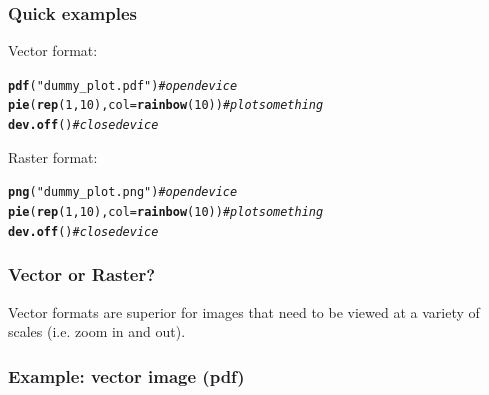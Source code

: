 \documentclass[12pt]{beamer}\usepackage[]{graphicx}\usepackage[]{color}
\makeatletter
\newcommand{\hlnum}[1]{\textcolor[rgb]{0.686,0.059,0.569}{#1}}%
\newcommand{\hlstr}[1]{\textcolor[rgb]{0.192,0.494,0.8}{#1}}%
\newcommand{\hlcom}[1]{\textcolor[rgb]{0.678,0.584,0.686}{\textit{#1}}}%
\newcommand{\hlstd}[1]{\textcolor[rgb]{0.345,0.345,0.345}{#1}}%
\newcommand{\hlkwc}[1]{\textcolor[rgb]{0.333,0.667,0.333}{#1}}%
\newcommand{\hlkwd}[1]{\textcolor[rgb]{0.737,0.353,0.396}{\textbf{#1}}}%
\newenvironment{kframe}{%
 \def\at@end@of@kframe{}%
 \ifinner\ifhmode%
  \def\at@end@of@kframe{\end{minipage}}%
  \begin{minipage}{\columnwidth}%
 \fi\fi%
 \def\FrameCommand##1{\hskip\@totalleftmargin \hskip-\fboxsep
 \colorbox{shadecolor}{##1}\hskip-\fboxsep
     \hskip-\linewidth \hskip-\@totalleftmargin \hskip\columnwidth}%
 \MakeFramed {\advance\hsize-\width
   \@totalleftmargin\z@ \linewidth\hsize
   \@setminipage}}%
 {\par\unskip\endMakeFramed%
 \at@end@of@kframe}
\newenvironment{knitrout}{}{} %
\makeatother
\begin{document}
\begin{frame}[fragile]
\frametitle{Quick examples}

Vector format:
\begin{knitrout}\footnotesize
{}\color{fgcolor}\begin{kframe}
\begin{alltt}
\hlkwd{pdf}\hlstd{(}\hlstr{"dummy_plot.pdf"}\hlstd{)}  \hlcom{# open device}
\hlkwd{pie}\hlstd{(}\hlkwd{rep}\hlstd{(}\hlnum{1}\hlstd{,} \hlnum{10}\hlstd{),} \hlkwc{col} \hlstd{=} \hlkwd{rainbow}\hlstd{(}\hlnum{10}\hlstd{))}  \hlcom{# plot something}
\hlkwd{dev.off}\hlstd{()}  \hlcom{# close device}
\end{alltt}
\end{kframe}
\end{knitrout}

\bigskip

Raster format:
\begin{knitrout}\footnotesize
{}\color{fgcolor}\begin{kframe}
\begin{alltt}
\hlkwd{png}\hlstd{(}\hlstr{"dummy_plot.png"}\hlstd{)}  \hlcom{# open device}
\hlkwd{pie}\hlstd{(}\hlkwd{rep}\hlstd{(}\hlnum{1}\hlstd{,} \hlnum{10}\hlstd{),} \hlkwc{col} \hlstd{=} \hlkwd{rainbow}\hlstd{(}\hlnum{10}\hlstd{))}  \hlcom{# plot something}
\hlkwd{dev.off}\hlstd{()}  \hlcom{# close device}
\end{alltt}
\end{kframe}
\end{knitrout}

\end{frame}


\begin{frame}
\frametitle{Vector or Raster?}

Vector formats are superior for images that need to be viewed at a variety of scales (i.e. zoom in and out).
\eb

\end{frame}


\begin{frame}
\frametitle{Example: vector image (pdf)}
\begin{center}
\end{center}
\end{frame}
\end{document}

